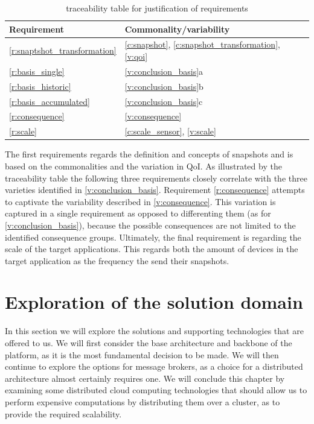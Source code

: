 \begin{table}[H]
\centering
\begin{tabular}{|l|l|} \hline
Requirement & Commonality/variability  \\ \hline
\ref{r:snaptshot_transformation} & \ref{c:snapshot}, \ref{c:snapshot_transformation}, \ref{v:qoi} \\ \hline
\ref{r:basis_single} & \ref{v:conclusion_basis}a \\ \hline
\ref{r:basis_historic} & \ref{v:conclusion_basis}b \\ \hline
\ref{r:basis_accumulated} & \ref{v:conclusion_basis}c \\ \hline
\ref{r:consequence} & \ref{v:consequence} \\ \hline
\ref{r:scale} & \ref{c:scale_sensor}, \ref{v:scale} \\ \hline
\end{tabular}
\caption{traceability table for justification of requirements}
\label{table:3_justification}
\end{table}

The first requirements regards the definition and concepts of snapshots and is based on the commonalities and the variation in QoI.  As illustrated by the traceability table the following three requirements closely correlate with the three varieties identified in \ref{v:conclusion_basis}. Requirement \ref{r:consequence} attempts to captivate the variability described in \ref{v:consequence}. This variation is captured in a single requirement as opposed to differenting them (as for \ref{v:conclusion_basis}), because the possible consequences are not limited to the identified consequence groups. Ultimately, the final requirement is regarding the scale of the target applications. This regards both the amount of devices in the target application as the frequency the send their snapshots. 

\section{Exploration of the solution domain}
In this section we will explore the solutions and supporting technologies that are offered to us. We will first consider the base architecture and backbone of the platform, as it is the most fundamental decision to be made. We will then continue to explore the options for message brokers, as a choice for a distributed architecture almost certainly requires one. We will conclude this chapter by examining some distributed cloud computing technologies that should allow us to perform expensive computations by distributing them over a cluster, as to provide the required scalability.
